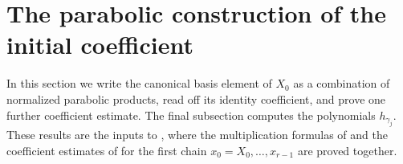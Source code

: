 \documentclass[11pt,a4paper,reqno]{amsart}
\numberwithin{equation}{section}
\theoremstyle{definition}
\theoremstyle{remark}
\theoremstyle{plain}
\begin{document}
\section{The parabolic construction of the initial coefficient}
\label{sec:parabolic}

In this section we write the canonical basis element of $X_0$ as a combination of normalized parabolic products, read off its identity coefficient, and prove one further coefficient estimate. 
The final subsection computes the polynomials $h_{\gamma_j}$. 
These results are the inputs to , where the multiplication formulas of  and the coefficient estimates of  for the first chain $x_0=X_0,\ldots,x_{r-1}$ are proved together.
\end{document}
